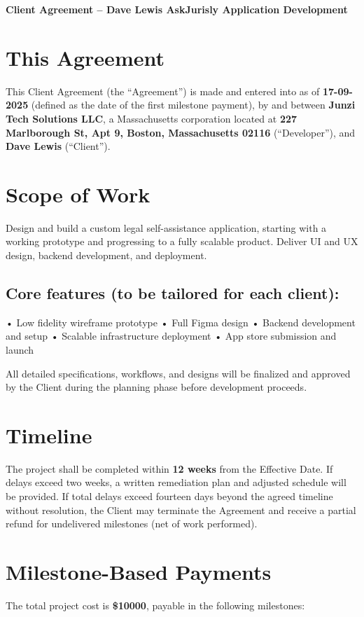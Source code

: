 \documentclass[11pt,letterpaper]{article}
\newcommand{\ClientName}{Dave Lewis}
\newcommand{\AppName}{AskJurisly}
\newcommand{\EffectiveDate}{17-09-2025}
\newcommand{\TimeLine}{12 weeks}
\newcommand{\TotalCost}{10000}
\newcommand{\FeaturesListPlaceholder}{• Low fidelity wireframe prototype
• Full Figma design
• Backend development and setup
• Scalable infrastructure deployment
• App store submission and launch}
\newcommand{\ScopeDescription}{Design and build a custom legal self-assistance application, starting with a working prototype and progressing to a fully scalable product. Deliver UI and UX design, backend development, and deployment.}
\begin{document}
\begin{center}
\Large\textbf{Client Agreement -- \ClientName{} \AppName{} Application Development}
\end{center}

\vspace{1em}

\section*{This Agreement}
This Client Agreement (the ``Agreement'') is made and entered into as of \textbf{\EffectiveDate{}} (defined as the date of the first milestone payment), by and between \textbf{Junzi Tech Solutions LLC}, a Massachusetts corporation located at \textbf{227 Marlborough St, Apt 9, Boston, Massachusetts 02116} (``Developer''), and \textbf{\ClientName{}} (``Client'').

\section{Scope of Work}
\ScopeDescription{}

\subsection*{Core features (to be tailored for each client):}
\FeaturesListPlaceholder{}

All detailed specifications, workflows, and designs will be finalized and approved by the Client during the planning phase before development proceeds.

\section{Timeline}
The project shall be completed within \textbf{\TimeLine{}} from the Effective Date. If delays exceed two weeks, a written remediation plan and adjusted schedule will be provided. If total delays exceed fourteen days beyond the agreed timeline without resolution, the Client may terminate the Agreement and receive a partial refund for undelivered milestones (net of work performed).

\section{Milestone-Based Payments}
The total project cost is \textbf{\$\TotalCost{}}, payable in the following milestones:
\end{document}
